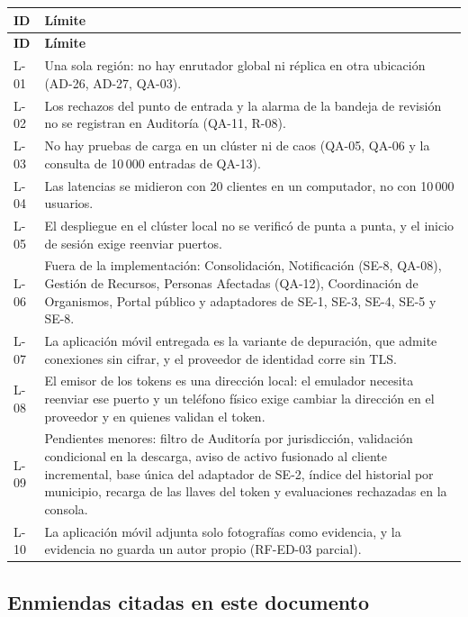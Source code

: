 \documentclass[11pt,a4paper]{article}
\begin{document}
{\small
\begin{longtable}{|P{1.4cm}|P{12.8cm}|}
  \hline
  \textbf{ID} & \textbf{Límite} \\ \hline
  \endfirsthead
  \hline
  \textbf{ID} & \textbf{Límite} \\ \hline
  \endhead
  L-01 & Una sola región: no hay enrutador global ni réplica en otra ubicación (AD-26, AD-27, QA-03). \\ \hline
  L-02 & Los rechazos del punto de entrada y la alarma de la bandeja de revisión no se registran en Auditoría (QA-11, R-08). \\ \hline
  L-03 & No hay pruebas de carga en un clúster ni de caos (QA-05, QA-06 y la consulta de 10\,000 entradas de QA-13). \\ \hline
  L-04 & Las latencias se midieron con 20 clientes en un computador, no con 10\,000 usuarios. \\ \hline
  L-05 & El despliegue en el clúster local no se verificó de punta a punta, y el inicio de sesión exige reenviar puertos. \\ \hline
  L-06 & Fuera de la implementación: Consolidación, Notificación (SE-8, QA-08), Gestión de Recursos, Personas Afectadas (QA-12), Coordinación de Organismos, Portal público y adaptadores de SE-1, SE-3, SE-4, SE-5 y SE-8. \\ \hline
  L-07 & La aplicación móvil entregada es la variante de depuración, que admite conexiones sin cifrar, y el proveedor de identidad corre sin TLS. \\ \hline
  L-08 & El emisor de los tokens es una dirección local: el emulador necesita reenviar ese puerto y un teléfono físico exige cambiar la dirección en el proveedor y en quienes validan el token. \\ \hline
  L-09 & Pendientes menores: filtro de Auditoría por jurisdicción, validación condicional en la descarga, aviso de activo fusionado al cliente incremental, base única del adaptador de SE-2, índice del historial por municipio, recarga de las llaves del token y evaluaciones rechazadas en la consola. \\ \hline
  L-10 & La aplicación móvil adjunta solo fotografías como evidencia, y la evidencia no guarda un autor propio (RF-ED-03 parcial). \\ \hline
\end{longtable}
}

\subsection*{Enmiendas citadas en este documento}
\end{document}
